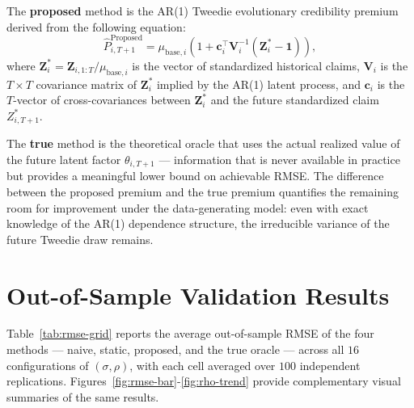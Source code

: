 \documentclass{sfuthesis}
\numberwithin{equation}{chapter}
\begin{document}
The \textbf{proposed} method is the AR(1) Tweedie evolutionary credibility premium derived from the following equation:
\begin{equation}
\hat{P}^{\text{Proposed}}_{i, T+1} = \mu_{\text{base}, i}\!\left(1 + \bm{c}_i^\top \bm{V}_i^{-1}(\bm{Z}_i^* - \bm{1})\right),
\label{eq:proposed-restated}
\end{equation}
where $\bm{Z}_i^* = \bm{Z}_{i, 1:T} / \mu_{\text{base}, i}$ is the vector of standardized historical claims, $\bm{V}_i$ is the $T \times T$ covariance matrix of $\bm{Z}_i^*$ implied by the AR(1) latent process, and $\bm{c}_i$ is the $T$-vector of cross-covariances between $\bm{Z}_i^*$ and the future standardized claim $Z^*_{i, T+1}$. 

The \textbf{true} method is the theoretical oracle that uses the actual realized value of the future latent factor $\theta_{i, T+1}$ --- information that is never available in practice but provides a meaningful lower bound on achievable RMSE. The difference between the proposed premium and the true premium quantifies
the remaining room for improvement under the data-generating model: even with
exact knowledge of the AR(1) dependence structure, the irreducible variance
of the future Tweedie draw remains.



\section{Out-of-Sample Validation Results}
\label{sec:results}

Table~\ref{tab:rmse-grid} reports the average out-of-sample RMSE of the four
methods --- naive, static, proposed, and the true oracle --- across all $16$
configurations of $(\sigma, \rho)$, with each cell averaged over $100$
independent replications. Figures~\ref{fig:rmse-bar}-\ref{fig:rho-trend}
provide complementary visual summaries of the same results.
\end{document}
